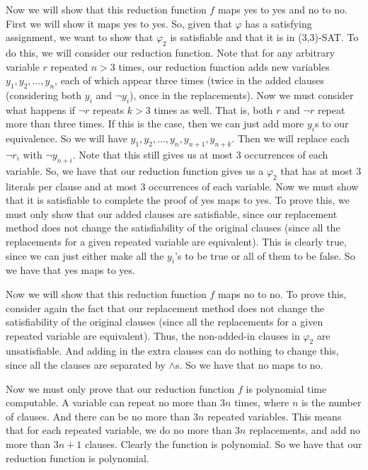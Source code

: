 \documentclass{article}
\begin{document}
Now we will show that this reduction function $f$ maps yes to yes and no
to no. First we will show it maps yes to yes. So, given that $\varphi$ has a
satisfying assignment, we want to show that $\varphi_{2}$ is satisfiable
and that it is in (3,3)-SAT. To do this, we will consider our reduction
function. Note that for any arbitrary variable $r$ repeated $n > 3$ times, our
reduction function adds new variables $y_{1}, y_{2}, \dots , y_{n}$, each of
which appear three times (twice in the added clauses (considering both
$y_{i}$ and $\neg {y_{i}}$), once in the replacements). Now
we must consider what happens if $\neg r$ repeats $k > 3$ times as well. That
is, both $r$ and $\neg r$ repeat more than three times. If this is the case,
then we can just add more $y_{i}$s to our equivalence. So we will have
$y_{1}, y_{2}, \dots , y_{n}, y_{n+1}, y_{n+k}$. Then we will replace
each $\neg r_{i}$ with $\neg y_{n+i}$. Note that this still gives us at most
3 occurrences of each variable.
 So, we have that our reduction function gives us a $\varphi_{2}$
that has at most 3 literals per clause and at most 3 occurrences of each
variable. Now we must show that it is satisfiable to complete the proof of
yes maps to yes. To prove this, we must only show that our added clauses
are satisfiable, since our replacement method does not change the
satisfiability of the original clauses (since all the replacements for a
given repeated variable are equivalent). This is clearly true, since we can
just either make all the $y_{i}$'s to be true or all of them to be false.
So we have that yes maps to yes.

Now we will show that this reduction function $f$ maps no to no. To prove this,
consider again the fact that our replacement method does not change the
satisfiability of the original clauses (since all the replacements for a given
repeated variable are equivalent). Thus, the non-added-in clauses in
$\varphi_{2}$ are unsatisfiable. And adding in the extra clauses can do nothing
to change this, since all the clauses are separated by $\wedge$s. So we have
that no maps to no.

Now we must only prove that our reduction function $f$ is polynomial time
computable. A variable can repeat no more than $3n$ times, where $n$ is the number
of clauses. And there can be no more than $3n$ repeated variables. This means
that for each repeated variable, we do no more than $3n$ replacements, and
add no more than $3n + 1$ clauses. Clearly the function is polynomial.
So we have that our reduction function is polynomial.
\end{document}
